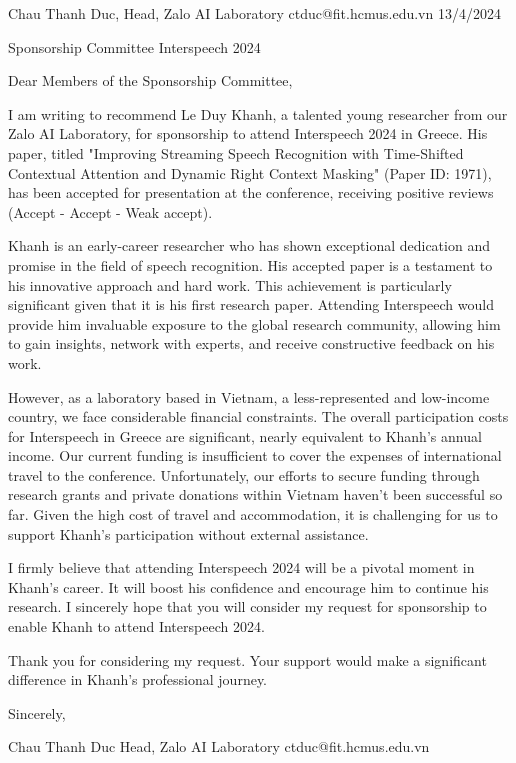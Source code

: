 Chau Thanh Duc,
Head, Zalo AI Laboratory
ctduc@fit.hcmus.edu.vn
13/4/2024

Sponsorship Committee
Interspeech 2024

Dear Members of the Sponsorship Committee,

I am writing to recommend Le Duy Khanh, a talented young researcher from our Zalo AI Laboratory, for sponsorship to attend Interspeech 2024 in Greece. His paper, titled "Improving Streaming Speech Recognition with Time-Shifted Contextual Attention and Dynamic Right Context Masking" (Paper ID: 1971), has been accepted for presentation at the conference, receiving positive reviews (Accept - Accept - Weak accept).

Khanh is an early-career researcher who has shown exceptional dedication and promise in the field of speech recognition. His accepted paper is a testament to his innovative approach and hard work. This achievement is particularly significant given that it is his first research paper. Attending Interspeech would provide him invaluable exposure to the global research community, allowing him to gain insights, network with experts, and receive constructive feedback on his work.

However, as a laboratory based in Vietnam, a less-represented and low-income country, we face considerable financial constraints. The overall participation costs for Interspeech in Greece are significant, nearly equivalent to Khanh's annual income. Our current funding is insufficient to cover the expenses of international travel to the conference. Unfortunately, our efforts to secure funding through research grants and private donations within Vietnam haven't been successful so far. Given the high cost of travel and accommodation, it is challenging for us to support Khanh's participation without external assistance. 

I firmly believe that attending Interspeech 2024 will be a pivotal moment in Khanh's career. It will boost his confidence and encourage him to continue his research. I sincerely hope that you will consider my request for sponsorship to enable Khanh to attend Interspeech 2024.

Thank you for considering my request. Your support would make a significant difference in Khanh's professional journey.

Sincerely,

Chau Thanh Duc
Head, Zalo AI Laboratory
ctduc@fit.hcmus.edu.vn
